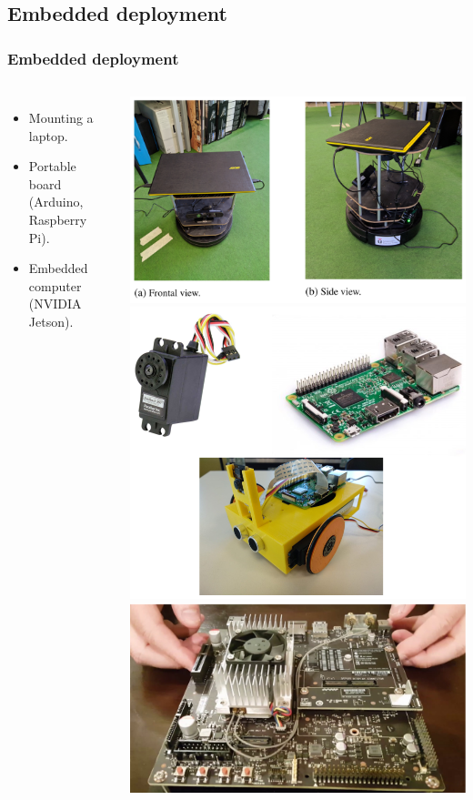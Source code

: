 \documentclass[11pt]{beamer}
\begin{document}
\subsection{Embedded deployment}
\begin{frame}
	\frametitle{Embedded deployment}
	\begin{columns}
		\begin{itemize}
			\item Mounting a laptop.
			\vspace{2cm}
			\item Portable board (Arduino, Raspberry Pi).
			\vspace{1cm}
			\item Embedded computer (NVIDIA Jetson).
		\end{itemize}
		
		\begin{center}
			\includegraphics[width=0.6\linewidth]{robot_tfg} \\
			\vspace{0.2cm}
			\includegraphics[width=0.55\linewidth]{pibot} \\
			\vspace{0.4cm}
			\includegraphics[width=0.6\linewidth]{tx2} \\
			
		\end{center}
	\end{columns}
\end{frame}
\end{document}
